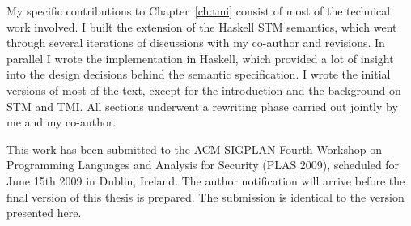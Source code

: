 My specific contributions to Chapter~\ref{ch:tmi} consist of most of the technical
work involved. I built the extension of the Haskell STM semantics, which went
through several iterations of discussions with my co-author and revisions. In
parallel I wrote the implementation in Haskell, which provided a lot of insight
into the design decisions behind the semantic specification. I wrote the initial
versions of most of the text, except for the introduction and the background on
STM and TMI. All sections underwent a rewriting phase carried out jointly by
me and my co-author.

This work has been submitted to the ACM SIGPLAN Fourth Workshop on Programming
Languages and Analysis for Security (PLAS 2009), scheduled for June 15th 2009
in Dublin, Ireland. The author notification will arrive before the final version
of this thesis is prepared. The submission is identical to the version presented
here.